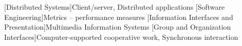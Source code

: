 \documentclass{sig-alternate}
\begin{document}

[Distributed Systems]{Client/server, Distributed applications}
[Software Engineering]{Metrics -- performance measures}
[Information Interfaces and Presentation]{Multimedia Information Systems}
[Group and Organization Interfaces]{Computer-supported cooperative work, Synchronous interaction}




%
%
%
%
%
%
%

\end{document}
